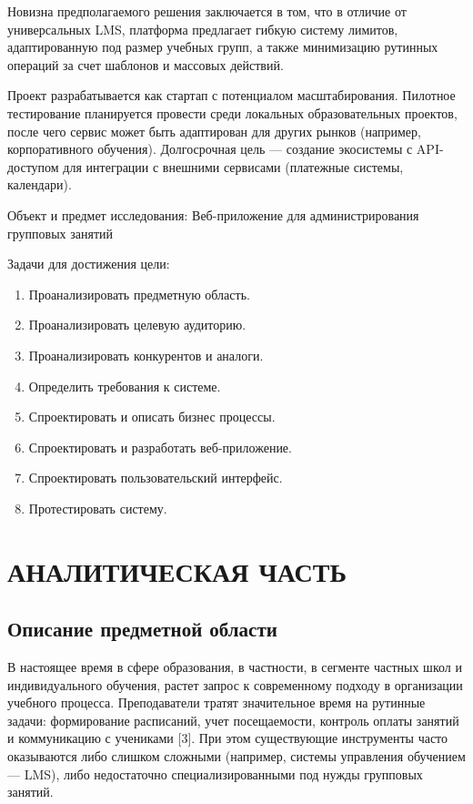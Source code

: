 \documentclass[a4paper,14pt,oneside]{extreport}
\begin{document}
Новизна предполагаемого решения заключается в том, что в отличие от универсальных LMS, платформа предлагает гибкую систему лимитов, адаптированную под размер учебных групп, а также минимизацию рутинных операций за счет шаблонов и массовых действий.

Проект разрабатывается как стартап с потенциалом масштабирования. Пилотное тестирование планируется провести среди локальных образовательных проектов, после чего сервис может быть адаптирован для других рынков (например, корпоративного обучения). Долгосрочная цель — создание экосистемы с API-доступом для интеграции с внешними сервисами (платежные системы, календари).

Объект и предмет исследования: Веб-приложение для администрирования групповых занятий

Задачи для достижения цели:

\begin{enumerate}
    \item Проанализировать предметную область.
    \item Проанализировать целевую аудиторию.
    \item Проанализировать конкурентов и аналоги.
    \item Определить требования к системе.
    \item Спроектировать и описать бизнес процессы.
    \item Спроектировать и разработать веб-приложение.
    \item Спроектировать пользовательский интерфейс.
    \item Протестировать систему.
\end{enumerate}

\chapter{АНАЛИТИЧЕСКАЯ ЧАСТЬ}



\section{Описание предметной области}
В настоящее время в сфере образования, в частности, в сегменте частных школ и индивидуального обучения, растет запрос к современному подходу в организации учебного процесса. Преподаватели тратят значительное время на рутинные задачи: формирование расписаний, учет посещаемости, контроль оплаты занятий и коммуникацию с учениками [3]. При этом существующие инструменты часто оказываются либо слишком сложными (например, системы управления обучением — LMS), либо недостаточно специализированными под нужды групповых занятий.
\end{document}
